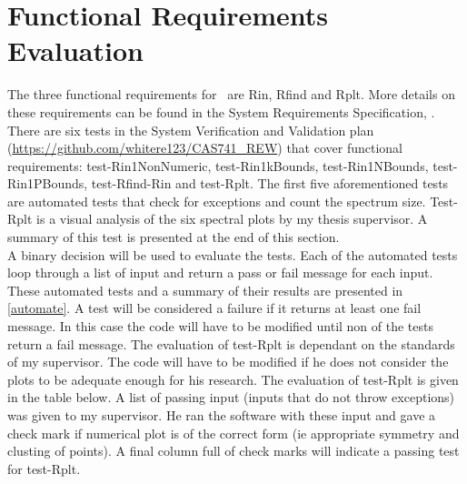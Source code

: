 \documentclass[12pt, titlepage]{article}
\begin{document}
\section{Functional Requirements Evaluation} 

The three functional requirements for \progname \ are Rin, Rfind and 
Rplt. More details on these requirements can be found in the System 
Requirements Specification, \cite{SRS}. There are six tests in the System 
Verification and Validation plan 
(\url{https://github.com/whitere123/CAS741_REW}) that cover functional 
requirements: test-Rin1NonNumeric, test-Rin1kBounds, test-Rin1NBounds, 
test-Rin1PBounds, test-Rfind-Rin and test-Rplt. The first five aforementioned 
tests are 
automated tests that check for exceptions and count the spectrum size.  
Test-Rplt is a visual analysis of the six spectral plots by my thesis 
supervisor. A summary of this test is presented at the end of this section. \\ 
A binary decision will be used to evaluate the tests. Each of the automated 
tests loop through a list of input and return a pass or fail message for each 
input. These automated tests and a summary of their results are presented in 
\ref{automate}. A test will be considered a failure if it returns at least one 
fail 
message. In this case the code will have to be modified until non of the tests 
return a fail message. The evaluation of test-Rplt is dependant on the 
standards of my supervisor. The code will have to be modified if he does not 
consider the plots to be adequate enough for his research. The evaluation of 
test-Rplt is given in the table below. A list of passing input (inputs that do 
not throw exceptions) was given to my supervisor. He ran the software with 
these input and gave a check mark if numerical plot is of the correct form (ie 
appropriate symmetry and clusting of points). A final column full of 
check marks will indicate a passing test for test-Rplt. \\
\end{document}
